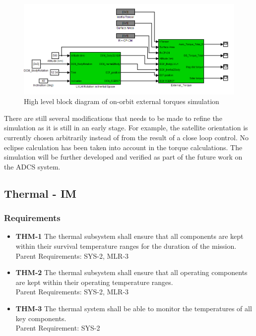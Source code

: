 \documentclass[12pt]{article}
\begin{document}
			\begin{figure}[!ht]
				\centering
				\includegraphics[width=\textwidth]{images/ADCS_simulink.png}
				\caption{High level block diagram of on-orbit external torques simulation}
				\label{fig:ADCS_simulink}
			\end{figure}

			There are still several modifications that needs to be made to refine the simulation as it is still in an early stage. For example, the satellite orientation is currently chosen arbitrarily instead of from the result of a close loop control. No eclipse calculation has been taken into account in the torque calculations. The simulation will be further developed and verified as part of the future work on the ADCS system. 


\newpage
\FloatBarrier

\subsection{Thermal - IM}
		
\subsubsection{Requirements}

\begin{itemize}
	\item \textbf{THM-1} The thermal subsystem shall ensure that all components are kept within their survival temperature ranges for the duration of the mission.
	\\
	Parent Requirements: SYS-2, MLR-3
\item \textbf{THM-2} The thermal subsystem shall ensure that all operating components are kept within their operating temperature ranges.
\\
Parent Requirements: SYS-2, MLR-3
\item \textbf{THM-3} The thermal system shall be able to monitor the temperatures of all key components.
\\
Parent Requirement: SYS-2
\end{itemize}
\end{document}
